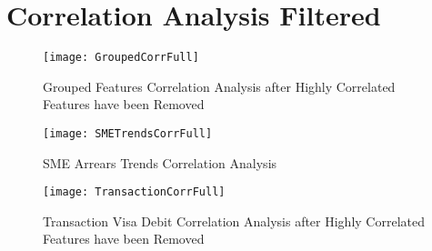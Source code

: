 
\chapter{Correlation Analysis Filtered} %

\label{AppendixC} %



\begin{figure}[H]
	\texttt{[image: GroupedCorrFull]}
	\caption{Grouped Features Correlation Analysis after Highly Correlated Features have been Removed}
	\label{fig:GroupedCorrFull}
\end{figure}

\begin{figure}[H]
	\texttt{[image: SMETrendsCorrFull]}
	\caption[SME Arrears Trends Correlation Analysis after Highly Correlated Features have been Removed]
	{SME Arrears Trends Correlation Analysis}
	\label{fig:SMETrendsCorrFull}
\end{figure}
\begin{figure}[H]
	\texttt{[image: TransactionCorrFull]}
	\caption{Transaction Visa Debit Correlation Analysis after Highly Correlated Features have been Removed}
	\label{fig:TransactionCorrFull}
\end{figure}